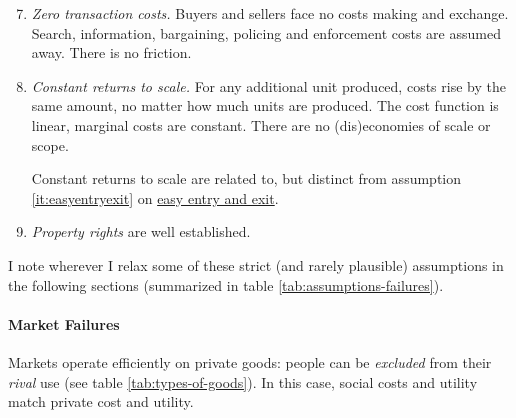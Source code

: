 \begin{enumerate} \setcounter{enumi}{6}
	\item \emph{Zero transaction costs.} \label{it:zerotransactioncosts}
		Buyers and sellers face no costs making and exchange. Search, information, bargaining, policing and enforcement costs are assumed away. There is no friction.
	\item \emph{Constant returns to scale.} \label{it:constantreturnstoscale} 
		For any additional unit produced, costs rise by the same amount, no matter how much units are produced. The cost function is linear, marginal costs are constant. There are no (dis)economies of scale or scope. 
	
		Constant returns to scale are related to, but distinct from assumption \ref{it:easyentryexit} on \hyperref[it:easyentryexit]{easy entry and exit}.
	\item \emph{Property rights} \label{it:propertyrights} are well established. 
\end{enumerate}

I note wherever I relax some of these strict (and rarely plausible) assumptions in the following sections (summarized in table \ref{tab:assumptions-failures}).

	

\paragraph{Market Failures}  \label{sec:market-failures} Markets operate efficiently on private goods: people can be \emph{excluded} from their \emph{rival} use (see table \ref{tab:types-of-goods}). In this case, social costs and utility match private cost and utility. 

